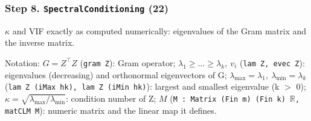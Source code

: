 \subsubsection*{Step 8. \texttt{SpectralConditioning} (22)}
$\kappa$ and VIF exactly as computed numerically: eigenvalues of the Gram matrix and the inverse matrix.

{\small\raggedright Notation: $G=Z^\top Z$ (\texttt{gram Z}): Gram operator; $\lambda_1\ge\dots\ge\lambda_k,\ v_i$ (\texttt{lam Z, evec Z}): eigenvalues (decreasing) and orthonormal eigenvectors of G; $\lambda_{\max}=\lambda_1,\ \lambda_{\min}=\lambda_k$ (\texttt{lam Z (iMax hk), lam Z (iMin hk)}): largest and smallest eigenvalue (k $>$ 0); $\kappa=\sqrt{\lambda_{\max}/\lambda_{\min}}$: condition number of Z; $M$ (\texttt{M : Matrix (Fin m) (Fin k) $\mathbb R$, matCLM M}): numeric matrix and the linear map it defines.}


